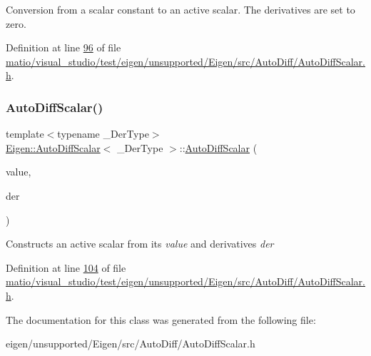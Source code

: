 Conversion from a scalar constant to an active scalar. The derivatives are set to zero. 

Definition at line \hyperlink{matio_2visual__studio_2test_2eigen_2unsupported_2_eigen_2src_2_auto_diff_2_auto_diff_scalar_8h_source_l00096}{96} of file \hyperlink{matio_2visual__studio_2test_2eigen_2unsupported_2_eigen_2src_2_auto_diff_2_auto_diff_scalar_8h_source}{matio/visual\+\_\+studio/test/eigen/unsupported/\+Eigen/src/\+Auto\+Diff/\+Auto\+Diff\+Scalar.\+h}.

\mbox{\label{class_eigen_1_1_auto_diff_scalar_a09641114cbb3b98a1132b82dff5939e3}} 
\subsubsection{\texorpdfstring{Auto\+Diff\+Scalar()}{AutoDiffScalar()}\hspace{0.1cm}{\footnotesize\ttfamily [8/8]}}
{\footnotesize\ttfamily template$<$typename \+\_\+\+Der\+Type$>$ \\
\hyperlink{class_eigen_1_1_auto_diff_scalar}{Eigen\+::\+Auto\+Diff\+Scalar}$<$ \+\_\+\+Der\+Type $>$\+::\hyperlink{class_eigen_1_1_auto_diff_scalar}{Auto\+Diff\+Scalar} (\begin{DoxyParamCaption}\item[{const Scalar \&}]{value,  }\item[{const \hyperlink{group___sparse_core___module}{Der\+Type} \&}]{der }\end{DoxyParamCaption})\hspace{0.3cm}{\ttfamily [inline]}}

Constructs an active scalar from its {\itshape value} and derivatives {\itshape der} 

Definition at line \hyperlink{matio_2visual__studio_2test_2eigen_2unsupported_2_eigen_2src_2_auto_diff_2_auto_diff_scalar_8h_source_l00104}{104} of file \hyperlink{matio_2visual__studio_2test_2eigen_2unsupported_2_eigen_2src_2_auto_diff_2_auto_diff_scalar_8h_source}{matio/visual\+\_\+studio/test/eigen/unsupported/\+Eigen/src/\+Auto\+Diff/\+Auto\+Diff\+Scalar.\+h}.



The documentation for this class was generated from the following file\+:\begin{DoxyCompactItemize}
\item 
eigen/unsupported/\+Eigen/src/\+Auto\+Diff/\+Auto\+Diff\+Scalar.\+h\end{DoxyCompactItemize}
